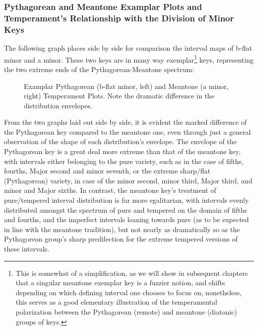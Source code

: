 \subsubsection{Pythagorean and Meantone Examplar Plots and Temperament's
Relationship with the Division of Minor
Keys}\label{pythagorean-and-meantone-examplar-plots-and-temperaments-relationship-with-the-division-of-minor-keys}

The following graph places side by side for comparison the interval maps
of b-flat minor and a minor. These two keys are in many way
exemplar\footnote{This is somewhat of a simplification, as we will show in subsequent chapters that a singular meantone exemplar key is a fuzzier notion, and shifts depending on which defining interval one chooses to focus on, nonetheless, this serves as a good elementary illustration of the temperamental polarization between the Pythagorean (remote) and meantone (diatonic) groups of keys.}
keys, representing the two extreme ends of the Pythagorean-Meantone
spectrum:



\begin{figure}[H]
\vspace{1.5em}
    \centering
    \caption[Examplar Pythagorean (b-flat minor) and Meantone (a minor) Temperament Plots. ]{ Examplar Pythagorean (b-flat minor, left) and Meantone (a minor, right) Temperament Plots. Note the dramatic difference in the distribution envelopes.}
\end{figure}    From the two graphs laid out side by side, it is evident the marked
difference of the Pythagorean key compared to the meantone one, even
through just a general observation of the shape of each distribution's
envelope. The envelope of the Pythagorean key is a great deal more
extreme than that of the meantone key, with intervals either belonging
to the pure variety, such as in the case of fifths, fourths, Major
second and minor seventh, or the extreme sharp/flat (Pythagorean)
variety, in case of the minor second, minor third, Major third, and
minor and Major sixths. In contrast, the meantone key's treatment of
pure/tempered interval distribution is far more egalitarian, with
intervals evenly distributed amongst the spectrum of pure and tempered
on the domain of fifths and fourths, and the imperfect intervals leaning
towards pure (as to be expected in line with the meantone tradition),
but not nearly as dramatically so as the Pythagorean group's sharp
predilection for the extreme tempered versions of these intervals.

